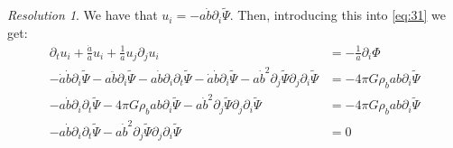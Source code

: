 \documentclass[10pt,a4paper]{article}
\theoremstyle{remark}
\newtheorem*{res}{Resolution}
\begin{document}
\begin{res}
  We have that $u_i=-a\dot{b} \partial_i \tilde{\Psi}$. Then, introducing this into \cref{eq:31} we get:
  \begin{align*}
    \partial_t u_i + \frac{\dot{a}}{a} u_i + \frac{1}{a} u_j \partial_j u_i                                                                                                                                                            & = -\frac{1}{a} \partial_i \Phi               \\
    -\dot{a} \dot{b} \partial_i\tilde{\Psi} -a\ddot{b} \partial_i\tilde{\Psi} -a\dot{b} \partial_i\partial_t \tilde{\Psi} - \dot{a} \dot{b} \partial_i\tilde{\Psi} -a\dot{b}^2 \partial_j\tilde{\Psi} \partial_j\partial_i\tilde{\Psi} & = -4\pi G \rho_b a b \partial_i\tilde{\Psi}  \\
    -a\dot{b} \partial_i\partial_t \tilde{\Psi} -4\pi G \rho_b a b \partial_i\tilde{\Psi} -a\dot{b}^2 \partial_j\tilde{\Psi} \partial_j\partial_i\tilde{\Psi}                                                                          & = - 4\pi G \rho_b a b \partial_i\tilde{\Psi} \\
    -a\dot{b} \partial_i\partial_t \tilde{\Psi} -a\dot{b}^2 \partial_j\tilde{\Psi} \partial_j\partial_i\tilde{\Psi}                                                                                                                    & = 0
  \end{align*}


\end{res}
\end{document}
